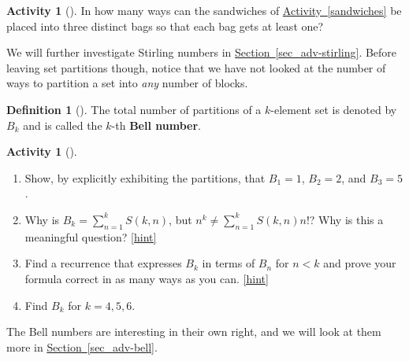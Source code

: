 \documentclass[10pt,]{book}
\newcommand{\terminology}[1]{\textbf{#1}}
\theoremstyle{plain}
\theoremstyle{definition}
\newtheorem{definition}[theorem]{Definition}
\theoremstyle{definition}
\theoremstyle{definition}
\newtheorem{activity}[project]{Activity}
\numberwithin{equation}{chapter}
\newcommand{\lt}{<}
\begin{document}
\begin{activity}[]\label{activity-198}
\hypertarget{p-1104}{}%
In how many ways can the sandwiches of \hyperref[sandwiches]{Activity~\ref{sandwiches}} be placed into three distinct bags so that each bag gets at least one?%
\end{activity}
\hypertarget{p-1106}{}%
We will further investigate Stirling numbers in \hyperref[sec_adv-stirling]{Section~\ref{sec_adv-stirling}}.  Before leaving set partitions though, notice that we have not looked at the number of ways to partition a set into \emph{any} number of blocks.%
\begin{definition}[{}]\label{def-bell}
\hypertarget{p-1107}{}%
The total number of partitions of a \(k\)-element set is denoted by \(B_k\) and is called the \(k\)-th \terminology{Bell number}.%
\end{definition}
\begin{activity}[]\label{BellNumberIntro}
\leavevmode%
\begin{enumerate}[font=\bfseries,label=(\alph*),ref=\alph*]
\item\label{task-213} \hypertarget{p-1108}{}%
Show, by explicitly exhibiting the partitions, that \(B_1 = 1\), \(B_2 = 2\), and \(B_3 = 5\).%
\item\label{task-214} \hypertarget{p-1110}{}%
Why is \(B_k = \sum_{n=1}^{k} S(k,n)\), but \(n^k \ne \sum_{n=1}^k S(k,n)n!\)?  Why is this a meaningful question?%
\hfill{\tiny\hyperlink{a-206.b}{[hint]}\hypertarget{q-206.b}{}}\item\label{task-215} \hypertarget{p-1112}{}%
Find a recurrence that expresses \(B_k\) in terms of \(B_n\) for \(n\lt  k\) and prove your formula correct in as many ways as you can.%
\hfill{\tiny\hyperlink{a-206.c}{[hint]}\hypertarget{q-206.c}{}}\item\label{task-216} \hypertarget{p-1116}{}%
Find \(B_k\) for \(k=4,5,6\).%
\end{enumerate}
\end{activity}
\hypertarget{p-1118}{}%
The Bell numbers are interesting in their own right, and we will look at them more in \hyperref[sec_adv-bell]{Section~\ref{sec_adv-bell}}.%
\typeout{************************************************}
\typeout{************************************************}
\end{document}
